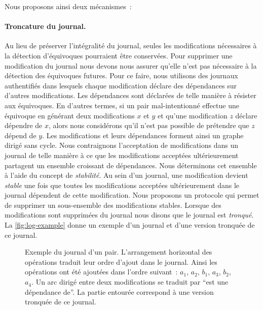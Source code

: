 Nous proposons ainsi deux mécanismes~:

\paragraph{Troncature du journal.} Au lieu de préserver l'intégralité du journal, seules les modifications nécessaires à la détection d'équivoques pourraient être conservées.
Pour supprimer une modification du journal nous devons nous assurer qu'elle n'est pas nécessaire à la détection des équivoques futures.
Pour ce faire, nous utilisons des journaux authentifiés dans lesquels chaque modification déclare des dépendances sur d'autres modifications.
Les dépendances sont déclarées de telle manière à résister aux équivoques.
En d'autres termes, si un pair mal-intentionné effectue une équivoque en générant deux modifications $x$ et $y$ et qu'une modification $z$ déclare dépendre de $x$, alors nous considérons qu'il n'est pas possible de prétendre que $z$ dépend de $y$.
Les modifications et leurs dépendances forment ainsi un graphe dirigé sans cycle.
Nous contraignons l'acceptation de modifications dans un journal de telle manière à ce que les modifications acceptées ultérieurement partagent un ensemble croissant de dépendances.
Nous déterminons cet ensemble à l'aide du concept de \emph{stabilité}.
Au sein d'un journal, une modification devient \emph{stable} une fois que toutes les modifications acceptées ultérieurement dans le journal dépendent de cette modification.
Nous proposons un protocole qui permet de supprimer un sous-ensemble des modifications stables.
Lorsque des modifications sont supprimées du journal nous disons que le journal est \emph{tronqué}.
La \autoref{fig:log-example} donne un exemple d'un journal et d'une version tronquée de ce journal.

\begin{figure}[hbt]
\centering
{}
\caption[Exemple du journal d'un pair]{Exemple du journal d'un pair.
L'arrangement horizontal des opérations traduit leur ordre d'ajout dans le journal.
Ainsi les opérations ont été ajoutées dans l'ordre suivant~: $a_1$, $a_2$, $b_1$, $a_3$, $b_2$, $a_4$.
Un arc dirigé entre deux modifications se traduit par \enquote{est une dépendance de}.
La partie entourée correspond à une version tronquée de ce journal.
}\label{fig:log-example}
\end{figure}

